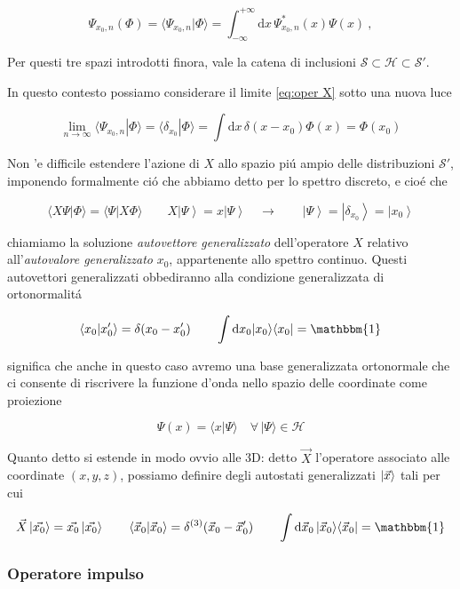 $$\Psi_{x_{0},n}(\Phi)=\langle\Psi_{x_{0},n}|\Phi\rangle=\int_{-\infty}^{+\infty}\mathrm{d}x\,\Psi_{x_{0},n}^{*}(x)\Psi(x)\ ,$$

Per questi tre spazi introdotti finora, vale la catena di inclusioni $\mathcal{S} \subset \mathcal{H} \subset \mathcal{S}'$.

In questo contesto possiamo considerare il limite \ref{eq:oper X} sotto una nuova luce

$$\operatorname*{lim}_{n\to\infty}\langle\Psi_{x_{0},n}|\Phi\rangle=\langle\delta_{x_{0}}|\Phi\rangle=\int\mathrm{d}x\,\delta(x-x_{0})\Phi(x)=\Phi(x_{0})$$

Non 'e difficile estendere l'azione di $X$ allo spazio pi\'u ampio delle distribuzioni $\mathcal{S}'$, imponendo formalmente ci\'o che abbiamo detto per lo spettro discreto, e cio\'e che

$$\langle X\Psi|\Phi\rangle=\langle\Psi|X\Phi\rangle \qquad X\left|\Psi\right\rangle=x\left|\Psi\right\rangle\quad\longrightarrow \qquad\left|\Psi\right\rangle=\left|\delta_{x_{0}}\right\rangle=\left|x_{0}\right\rangle$$

chiamiamo la soluzione \textit{autovettore generalizzato} dell'operatore $X$ relativo all'\textit{autovalore generalizzato} $x_0$, appartenente allo spettro continuo. Questi autovettori generalizzati obbediranno alla condizione generalizzata di ortonormalit\'a

$$\langle x_{0}|x_{0}^{\prime}\rangle=\delta(x_{0}-x_{0}^{\prime}) \qquad \int \mathrm{d}x_0 \ket{x_0}\bra{x_0} = \mathbbm{1}$$

significa che anche in questo caso avremo una base generalizzata ortonormale che ci consente di riscrivere la funzione d'onda nello spazio delle coordinate come proiezione

$$\Psi(x)=\langle x|\Psi\rangle\quad\forall\,|\Psi\rangle\in{\mathcal{H}}$$

Quanto detto si estende in modo ovvio alle 3D: detto $\vec{X}$ l'operatore associato alle coordinate $(x, y, z)$, possiamo definire degli autostati generalizzati $\ket{\vec{x}}$ tali per cui

$${\vec{X}}\left|{\vec{x_{0}}}\right\rangle={\vec{x_{0}}}\left|{\vec{x_{0}}}\right\rangle
\qquad \langle\vec{x}_{0}|\vec{x}_{0}\rangle=\delta^{(3)}(\vec{x}_{0}-\vec{x}_{0}^{\prime}) \qquad \int\mathrm{d}\vec{x}_{0}\,|\vec{x}_{0}\rangle\langle\vec{x}_{0}|=\mathbbm{1}$$
	
	
\subsubsection{Operatore impulso}
	
